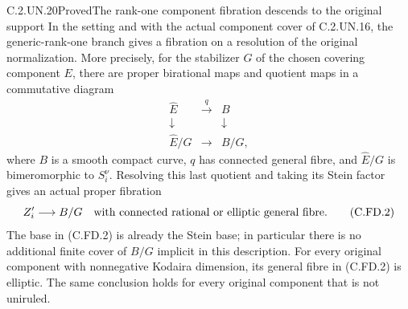 \begin{statement}{C.2.UN.20}{Proved}{The rank-one component fibration descends to the original support}
In the setting and with the actual component cover of C.2.UN.16,
the generic-rank-one branch gives a fibration on a resolution of
the original normalization. More precisely, for the stabilizer
$G$ of the chosen covering component $E$, there are proper
birational maps and quotient maps in a commutative diagram
\[
\begin{array}{ccc}
 \widehat E&\xrightarrow{\ q\ }&B\\
 \downarrow&&\downarrow\\
 \widehat E/G&\longrightarrow&B/G,
\end{array}                                                    \tag{C.FD.1}
\]
where $B$ is a smooth compact curve, $q$ has connected general
fibre, and $\widehat E/G$ is bimeromorphic to $S_i^\nu$.
Resolving this last quotient and taking its Stein factor gives
an actual proper fibration
\[
        Z'_i\longrightarrow B/G
        \quad\hbox{with connected rational or elliptic general fibre}.
                                                               \tag{C.FD.2}
\]
The base in (C.FD.2) is already the Stein base; in particular
there is no additional finite cover of $B/G$ implicit in this
description. For every original component with nonnegative
Kodaira dimension, its general fibre in (C.FD.2) is elliptic.
The same conclusion holds for every original component that
is not uniruled.
\end{statement}
